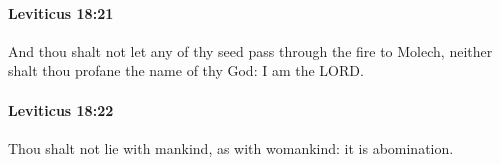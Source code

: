 		\paragraph{Leviticus 18:21} %
			\label{LEVITICUS-18-21}

			And thou shalt not let any of thy seed pass through the fire to Molech, neither shalt thou profane the name of thy God: I am the LORD.


		\paragraph{Leviticus 18:22} %
			\label{LEVITICUS-18-22}

			Thou shalt not lie with mankind, as with womankind: it is abomination.


